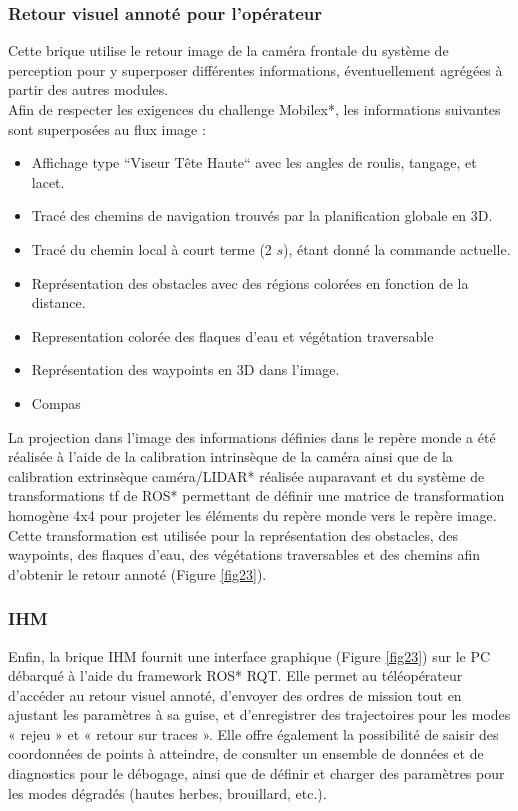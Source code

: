 \subsubsection{Retour visuel annoté pour l'opérateur}
Cette brique utilise le retour image de la caméra frontale du système de perception pour y superposer différentes informations, éventuellement agrégées à partir des autres modules. \\

\indent Afin de respecter les exigences du challenge Mobilex*, les informations suivantes sont superposées au flux image : \\
\begin{itemize}
\renewcommand{\labelitemi}{$\bullet$}
    \item Affichage type “Viseur Tête Haute“ avec les angles de roulis, tangage, et lacet.
    \item Tracé des chemins de navigation trouvés par la planification globale en 3D.
    \item Tracé du chemin local à court terme (2 $s$), étant donné la commande actuelle.
    \item Représentation des obstacles avec des régions colorées en fonction de la distance.
    \item Representation colorée des flaques d'eau et végétation traversable 
    \item Représentation des waypoints en 3D dans l'image.
    \item Compas\\
\end{itemize}

\indent La projection dans l'image des informations définies dans le repère monde a été réalisée à l'aide de la calibration intrinsèque de la caméra ainsi que de la calibration extrinsèque caméra/LIDAR* réalisée auparavant et du système de transformations tf de ROS* permettant de définir une matrice de transformation homogène 4x4 pour projeter les éléments du repère monde vers le repère image. Cette transformation est utilisée pour la représentation des obstacles, des waypoints, des flaques d'eau, des végétations traversables et des chemins afin d'obtenir le retour annoté (Figure \ref{fig23}).

\subsubsection{IHM}
Enfin, la brique IHM fournit une interface graphique (Figure \ref{fig23}) sur le PC débarqué à l'aide du framework ROS* RQT. Elle permet au téléopérateur d'accéder au retour visuel annoté, d'envoyer des ordres de mission tout en ajustant les paramètres à sa guise, et d'enregistrer des trajectoires pour les modes « rejeu » et « retour sur traces ». Elle offre également la possibilité de saisir des coordonnées de points à atteindre, de consulter un ensemble de données et de diagnostics pour le débogage, ainsi que de définir et charger des paramètres pour les modes dégradés (hautes herbes, brouillard, etc.).

